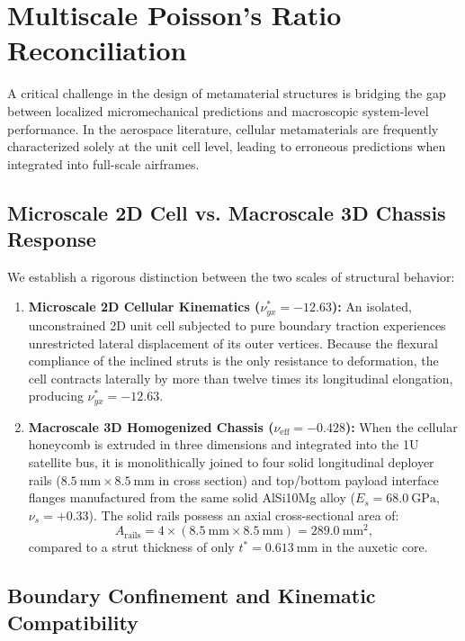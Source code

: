 \section{Multiscale Poisson's Ratio Reconciliation}
\label{sec:multiscale_poisson}

A critical challenge in the design of metamaterial structures is bridging the gap between localized micromechanical predictions and macroscopic system-level performance. In the aerospace literature, cellular metamaterials are frequently characterized solely at the unit cell level, leading to erroneous predictions when integrated into full-scale airframes.

\subsection{Microscale 2D Cell vs. Macroscale 3D Chassis Response}
\label{subsec:micro_vs_macro}

We establish a rigorous distinction between the two scales of structural behavior:
\begin{enumerate}
\item \textbf{Microscale 2D Cellular Kinematics ($\nu_{yx}^* = -12.63$):} An isolated, unconstrained 2D unit cell subjected to pure boundary traction experiences unrestricted lateral displacement of its outer vertices. Because the flexural compliance of the inclined struts is the only resistance to deformation, the cell contracts laterally by more than twelve times its longitudinal elongation, producing $\nu_{yx}^* = -12.63$.
\item \textbf{Macroscale 3D Homogenized Chassis ($\nu_{\text{eff}} = -0.428$):} When the cellular honeycomb is extruded in three dimensions and integrated into the 1U satellite bus, it is monolithically joined to four solid longitudinal deployer rails ($\SI{8.5}{\milli\meter} \times \SI{8.5}{\milli\meter}$ in cross section) and top/bottom payload interface flanges manufactured from the same solid AlSi10Mg alloy ($E_s = \SI{68.0}{\giga\pascal}$, $\nu_s = +0.33$). The solid rails possess an axial cross-sectional area of:
\begin{equation}
A_{\text{rails}} = 4 \times (\SI{8.5}{\milli\meter} \times \SI{8.5}{\milli\meter}) = \SI{289.0}{\milli\meter^2},
\label{eq:rail_area}
\end{equation}
compared to a strut thickness of only $t^* = \SI{0.613}{\milli\meter}$ in the auxetic core.
\end{enumerate}

\subsection{Boundary Confinement and Kinematic Compatibility}
\label{subsec:boundary_confinement}

